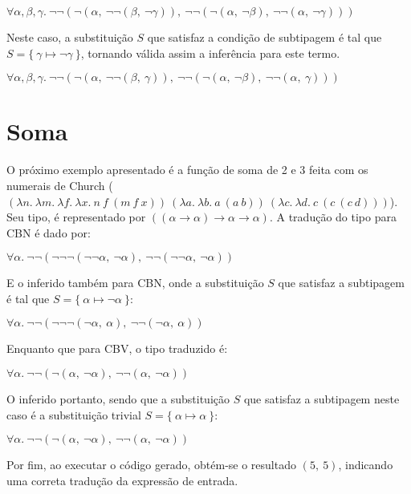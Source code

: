 \lstset{extendedchars=false, escapeinside=''}
\begin{center}
  $\forall\alpha,\beta,\gamma.\ \neg\neg(\neg(\alpha,\ \neg\neg(\beta,\ \neg\gamma)),\ \neg\neg(\neg(\alpha,\ \neg\beta),\ \neg\neg(\alpha,\ \neg\gamma)))$
\end{center}
Neste caso, a substituição $S$ que satisfaz a condição de subtipagem é tal que $S = \{\ \gamma \mapsto \neg\gamma\ \}$, tornando válida assim a inferência para este termo.
\lstset{extendedchars=false, escapeinside=''}
\begin{center}
  $\forall\alpha,\beta,\gamma.\ \neg\neg(\neg(\alpha,\ \neg\neg(\beta,\ \gamma)),\ \neg\neg(\neg(\alpha,\ \neg\beta),\ \neg\neg(\alpha,\ \gamma)))$
\end{center}

\section{Soma}
O próximo exemplo apresentado é a função de soma de 2 e 3 feita com os numerais de Church ($(\lambda n.\ \lambda m.\ \lambda f.\ \lambda x.\ n\ f\ (m\ f\ x))\ (\lambda a.\ \lambda b.\ a\ (a\ b))\ (\lambda c.\ \lambda d.\ c\ (c\ (c\ d)))$).
Seu tipo, é representado por $((\alpha \to \alpha) \to \alpha \to \alpha)$.
A tradução do tipo para CBN é dado por:
\lstset{extendedchars=false, escapeinside=''}
\begin{center}
  $\forall\alpha.\ \neg\neg(\neg\neg\neg(\neg\neg\alpha,\ \neg\alpha),\ \neg\neg(\neg\neg\alpha,\ \neg\alpha))$
\end{center}
E o inferido também para CBN, onde a substituição $S$ que satisfaz a subtipagem é tal que $S = \{\ \alpha \mapsto \neg\alpha\ \}$:
\lstset{extendedchars=false, escapeinside=''}
\begin{center}
  $\forall\alpha.\ \neg\neg(\neg\neg\neg(\neg\alpha,\ \alpha),\ \neg\neg(\neg\alpha,\ \alpha))$
\end{center}
Enquanto que para CBV, o tipo traduzido é:
\lstset{extendedchars=false, escapeinside=''}
\begin{center}
  $\forall\alpha.\ \neg\neg(\neg(\alpha,\ \neg\alpha),\ \neg\neg(\alpha,\ \neg\alpha))$
\end{center}
O inferido portanto, sendo que a substituição $S$ que satisfaz a subtipagem neste caso é a substituição trivial $S = \{\ \alpha \mapsto \alpha\ \}$:
\lstset{extendedchars=false, escapeinside=''}
\begin{center}
  $\forall\alpha.\ \neg\neg(\neg(\alpha,\ \neg\alpha),\ \neg\neg(\alpha,\ \neg\alpha))$
\end{center}
Por fim, ao executar o código gerado, obtém-se o resultado $(5,\ 5)$, indicando uma correta tradução da expressão de entrada.

